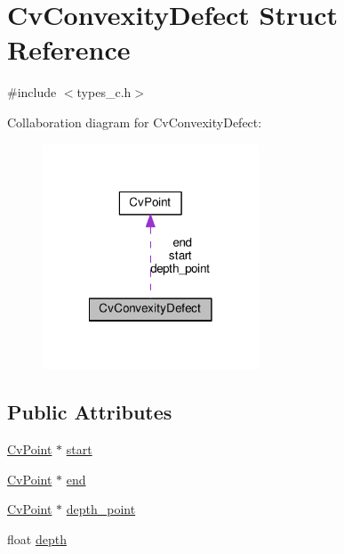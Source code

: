 \hypertarget{structCvConvexityDefect}{\section{Cv\-Convexity\-Defect Struct Reference}
\label{structCvConvexityDefect}
}


{\ttfamily \#include $<$types\-\_\-c.\-h$>$}



Collaboration diagram for Cv\-Convexity\-Defect\-:\nopagebreak
\begin{figure}[H]
\begin{center}
\leavevmode
\includegraphics[width=182pt]{structCvConvexityDefect__coll__graph}
\end{center}
\end{figure}
\subsection*{Public Attributes}
\begin{DoxyCompactItemize}
\item 
\hyperlink{structCvPoint}{Cv\-Point} $\ast$ \hyperlink{structCvConvexityDefect_a77610777f5d9932bc370db1c80476993}{start}
\item 
\hyperlink{structCvPoint}{Cv\-Point} $\ast$ \hyperlink{structCvConvexityDefect_ac0e20e337f3a9eeaf845f1e45f0d8529}{end}
\item 
\hyperlink{structCvPoint}{Cv\-Point} $\ast$ \hyperlink{structCvConvexityDefect_a36b87ca2851365c18ad6b9c361b820f1}{depth\-\_\-point}
\item 
float \hyperlink{structCvConvexityDefect_aa176ccc3afe0af7aa25e65f1ec849cc4}{depth}
\end{DoxyCompactItemize}


